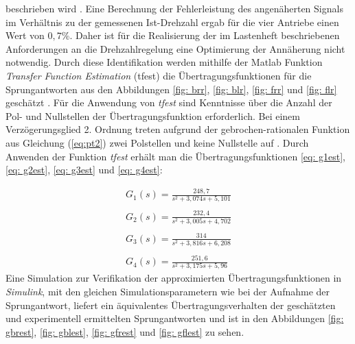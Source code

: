 			beschrieben wird \cite{unbehauen,lunze}. Eine Berechnung der Fehlerleistung des angenäherten Signals im Verhältnis zu der gemessenen Ist-Drehzahl ergab für die vier Antriebe einen Wert von $0{,}7$\%. Daher ist für die Realisierung der im Lastenheft beschriebenen Anforderungen an die Drehzahlregelung eine Optimierung der Annäherung nicht notwendig.
			Durch diese Identifikation werden mithilfe der Matlab Funktion \textit{Transfer Function Estimation} (tfest) die Übertragungsfunktionen für die Sprungantworten aus den Abbildungen \ref{fig: brr}, \ref{fig: blr}, \ref{fig: frr} und \ref{fig: flr} geschätzt \cite{tfest}. Für die Anwendung von \textit{tfest} sind Kenntnisse über die Anzahl der Pol- und Nullstellen der Übertragungsfunktion erforderlich. Bei einem Verzögerungsglied 2. Ordnung treten aufgrund der gebrochen-rationalen Funktion aus Gleichung (\ref{eq:pt2}) zwei Polstellen und keine Nullstelle auf \cite{unbehauen}. Durch Anwenden der Funktion \textit{tfest} erhält man die Übertragungsfunktionen \ref{eq: g1est}, \ref{eq: g2est}, \ref{eq: g3est} und \ref{eq: g4est}: 
			
			\begin{align}
			\label{eq: g1est}
			G_{1}(s)=\frac{248{,}7}{s^2+3{,}074s+5{,}101}\\\nonumber\\
			\label{eq: g2est}
			G_{2}(s)=\frac{232{,}4}{s^2+3{,}005s+4{,}702}\\\nonumber\\
			\label{eq: g3est}
			G_{3}(s)=\frac{314}{s^2+3{,}816s+6{,}208}\\\nonumber\\
			\label{eq: g4est}
			G_{4}(s)=\frac{251{,}6}{s^2+3{,}175s+5{,}96}
			\end{align}\newline
			Eine Simulation zur Verifikation der approximierten Übertragungsfunktionen in \textit{Simulink}, mit den gleichen Simulationsparametern wie bei der Aufnahme der Sprungantwort, liefert ein äquivalentes Übertragungsverhalten der geschätzten und experimentell ermittelten Sprungantworten und ist in den Abbildungen \ref{fig: gbrest}, \ref{fig: gblest}, \ref{fig: gfrest} und \ref{fig: gflest} zu sehen.
			 
